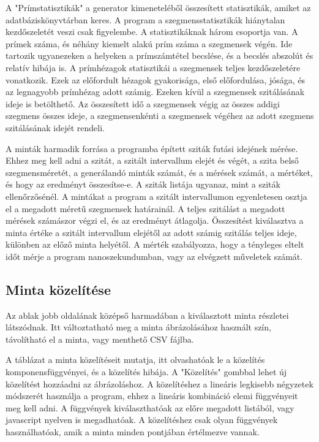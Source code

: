 A "Prímstatisztikák" a generator kimeneteléből összesített statisztikák, amiket az adatbáziskönyvtárban keres.
A program a szegmensstatisztikák hiánytalan kezdőszeletét veszi csak figyelembe.
A statisztikáknak három csoportja van. A prímek száma, és néhány kiemelt alakú prím száma a szegmensek végén. Ide tartozik ugyanezeken a helyeken a prímszámtétel becslése, és a becslés abszolút és relatív hibája is.
A prímhézagok statisztikái a szegmensek teljes kezdőszeletére vonatkozik.
Ezek az előfordult hézagok gyakorisága, első előfordulása, jósága, és az legnagyobb prímhézag adott számig.
Ezeken kívül a szegmensek szitálásának ideje is betölthető.
Az összesített idő a szegmensek végig az összes addigi szegmens összes ideje, a szegmensenkénti a szegmensek végéhez az adott szegmens szitálásának idejét rendeli.

A minták harmadik forrása a programba épített sziták futási idejének mérése.
Ehhez meg kell adni a szitát, a szitált intervallum elejét és végét, a szita belső szegmensméretét, a generálandó minták számát, és a mérések számát, a mértéket, és hogy az eredményt összesítse-e.
A sziták listája ugyanaz, mint a sziták ellenőrzősénél.
A mintákat a program a szitált intervallumon egyenletesen osztja el a megadott méretű szegmensek határainál.
A teljes szitálást a megadott mérések számászor végzi el, és az eredményt átlagolja.
Összesítést kiválasztva a minta értéke a szitált intervallum elejétől az adott számig szitálás teljes ideje, különben az előző minta helyétől.
A mérték szabályozza, hogy a tényleges eltelt időt mérje a program nanoszekundumban, vagy az elvégzett műveletek számát.

\subsection{Minta közelítése}

Az ablak jobb oldalának középső harmadában a kiválasztott minta részletei látszódnak.
Itt változtatható meg a minta ábrázolásához használt szín, távolítható el a minta,
vagy menthető CSV fájlba.

A táblázat a minta közelítéseit mutatja,
itt olvashatóak le a közelítés komponensfüggvényei, és a közelítés hibája.
A "Közelítés" gombbal lehet új közelítést hozzáadni az ábrázoláshoz.
A közelítéshez a lineáris legkisebb négyzetek módszerét használja a program,
ehhez a lineáris kombináció elemi függvényeit meg kell adni.
A függvények kiválaszthatóak az előre megadott listából,
vagy javascript nyelven is megadhatóak.
A közelítéshez csak olyan függvények használhatóak, amik a minta
minden pontjában értélmezve vannak.

